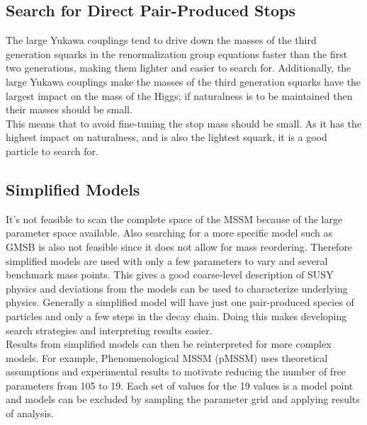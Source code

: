 \subsection{Search for Direct Pair-Produced Stops}

The large Yukawa couplings tend to drive down the masses of the third generation squarks in the renormalization group equations faster than the first two generations, making them lighter and easier to search for.  Additionally, the large Yukawa couplings make the masses of the third generation squarks have the largest impact on the mass of the Higgs; if naturalness is to be maintained then their masses should be small.  \\

This means that to avoid fine-tuning the stop mass should be small.  As it has the highest impact on naturalness, and is also the lightest squark, it is a good particle to search for. \color{red}{Some more motivation here?}\color{black}{}

\subsection{Simplified Models} %

It's not feasible to scan the complete space of the MSSM because of the large parameter space available.  Also searching for a more specific model such as GMSB is also not feasible since it does not allow for mass reordering.  Therefore simplified models are used with only a few parameters to vary and several benchmark mass points.  This gives a good coarse-level description of SUSY physics and deviations from the models can be used to characterize underlying physics.  Generally a simplified model will have just one pair-produced species of particles and only a few steps in the decay chain.  Doing this makes developing search strategies and interpreting results easier.  \\

Results from simplified models can then be reinterpreted for more complex models.  For example, Phenomenological MSSM (pMSSM) uses theoretical assumptions and experimental results to motivate reducing the number of free parameters from 105 to 19.  Each set of values for the 19 values is a model point and models can be excluded by sampling the parameter grid and applying results of analysis.  \\






